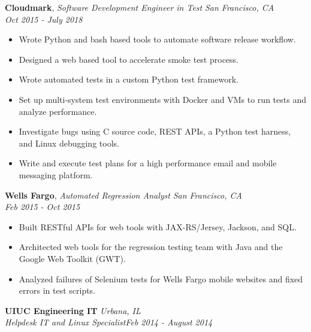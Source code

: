 \documentclass{article}
\newenvironment{changemargin}[2]{%
  \begin{list}{}{%
    \setlength{\topsep}{0pt}%
    \setlength{\leftmargin}{#1}%
    \setlength{\rightmargin}{#2}%
    \setlength{\listparindent}{\parindent}%
    \setlength{\itemindent}{\parindent}%
    \setlength{\parsep}{\parskip}%
  }%
  \item[]}{\end{list}
}
\newenvironment{body} {
	\vspace*{-16pt}
	\begin{changemargin}{-0.25in}{-0.5in}
  }	
	{\end{changemargin}
}
\begin{document}
\begin{body}

	\vspace{20pt}
	\textbf{Cloudmark}, \emph{Software Development Engineer in Test} \hfill \emph{San Francisco, CA}\\
	\hfill \emph{Oct 2015 - July 2018}\\
	\vspace*{-16pt}
	\begin{itemize} \itemsep -0pt  %
	    \item Wrote Python and bash based tools to automate software release workflow.
		\item Designed a web based tool to accelerate smoke test process.
		\item Wrote automated tests in a custom Python test framework.
		\item Set up multi-system test environments with Docker and VMs to run tests and analyze performance.
\item Investigate bugs using C source code, REST APIs, a Python test harness, and Linux debugging tools.
		\item Write and execute test plans for a high performance email and mobile messaging platform.
	\end{itemize}
	
	\vspace{14pt}
	\textbf{Wells Fargo}, \emph{Automated Regression Analyst} \hfill \emph{San Francisco, CA}\\
	\hfill \emph{Feb 2015 - Oct 2015}\\
	\vspace*{-16pt}
	\begin{itemize} \itemsep -0pt  %
		\item Built RESTful APIs for web tools with JAX-RS/Jersey, Jackson, and SQL.
		\item Architected web tools for the regression testing team with Java and the Google Web Toolkit (GWT).
		\item Analyzed failures of Selenium tests for Wells Fargo mobile websites and fixed errors in test scripts.	
	\end{itemize}



	\vspace{14pt}
	\textbf{UIUC Engineering IT} \hfill \emph{Urbana, IL}\\
	\emph{Helpdesk IT and Linux Specialist}\hfill \emph{Feb 2014 - August 2014}\\


\end{body}
\end{document}
